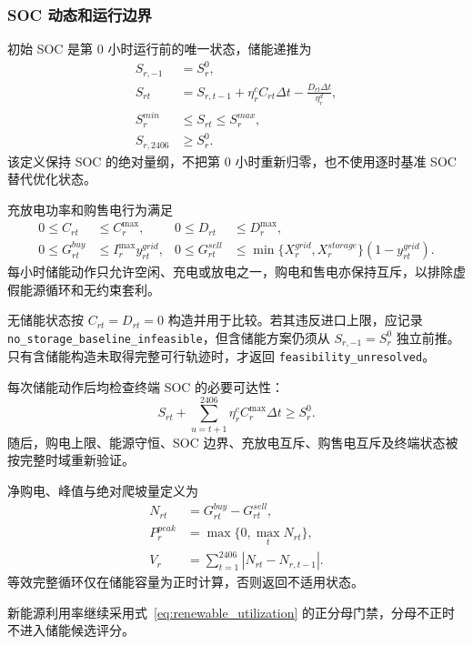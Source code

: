 \subsubsection{SOC 动态和运行边界}

初始 SOC 是第 $0$ 小时运行前的唯一状态，储能递推为
\begin{align}
S_{r,-1}&=S_r^0,\\
S_{rt}&=S_{r,t-1}
+\eta_r^cC_{rt}\Delta t
-\frac{D_{rt}\Delta t}{\eta_r^d}, \label{eq:soc}\\
S_r^{min}&\le S_{rt}\le S_r^{max},\\
S_{r,2406}&\ge S_r^0. \label{eq:terminal_soc}
\end{align}
该定义保持 SOC 的绝对量纲，不把第 $0$ 小时重新归零，也不使用逐时基准 SOC 替代优化状态。

充放电功率和购售电行为满足
\begin{align}
0\le C_{rt}&\le C_r^{\max},&
0\le D_{rt}&\le D_r^{\max},\\
0\le G_{rt}^{buy}
&\le I_r^{\max}y_{rt}^{grid},&
0\le G_{rt}^{sell}
&\le \min\{X_r^{grid},X_r^{storage}\}(1-y_{rt}^{grid}).
\end{align}
每小时储能动作只允许空闲、充电或放电之一，购电和售电亦保持互斥，以排除虚假能源循环和无约束套利。

无储能状态按 $C_{rt}=D_{rt}=0$ 构造并用于比较。若其违反进口上限，应记录 \texttt{no\_storage\_baseline\_infeasible}，但含储能方案仍须从 $S_{r,-1}=S_r^0$ 独立前推。只有含储能构造未取得完整可行轨迹时，才返回 \texttt{feasibility\_unresolved}。

每次储能动作后均检查终端 SOC 的必要可达性：
\begin{equation}
S_{rt}+\sum_{u=t+1}^{2406}
\eta_r^cC_r^{\max}\Delta t\ge S_r^0.
\end{equation}
随后，购电上限、能源守恒、SOC 边界、充放电互斥、购售电互斥及终端状态被按完整时域重新验证。

净购电、峰值与绝对爬坡量定义为
\begin{align}
N_{rt}&=G_{rt}^{buy}-G_{rt}^{sell},\\
P_r^{peak}&=\max\{0,\max_tN_{rt}\},\\
V_r&=\sum_{t=1}^{2406}|N_{rt}-N_{r,t-1}|.
\end{align}
等效完整循环仅在储能容量为正时计算，否则返回不适用状态。

新能源利用率继续采用式~\eqref{eq:renewable_utilization} 的正分母门禁，分母不正时不进入储能候选评分。

